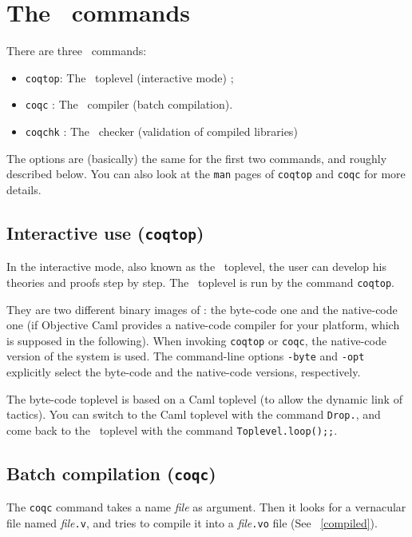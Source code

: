 \chapter[The \Coq~commands]{The \Coq~commands\label{Addoc-coqc}
}

There are three \Coq~commands: 
\begin{itemize}
\item {\tt coqtop}: The \Coq\ toplevel (interactive mode) ; 
\item {\tt coqc} : The \Coq\ compiler (batch compilation).
\item {\tt coqchk} : The \Coq\ checker (validation of compiled libraries)
\end{itemize}
The options are (basically) the same for the first two commands, and
roughly described below. You can also look at the \verb!man! pages of
\verb!coqtop! and \verb!coqc! for more details.


\section{Interactive use ({\tt coqtop})}

In the interactive mode, also known as the \Coq~toplevel, the user can
develop his theories and proofs step by step.  The \Coq~toplevel is
run by the command {\tt coqtop}. 

\label{binary-images}
They are two different binary images of \Coq: the byte-code one and
the native-code one (if Objective Caml provides a native-code compiler
for your platform, which is supposed in the following).  When invoking
\verb!coqtop! or \verb!coqc!, the native-code version of the system is
used.  The command-line options \verb!-byte! and \verb!-opt! explicitly
select the byte-code and the native-code versions, respectively.

The byte-code toplevel is based on a Caml
toplevel (to allow the dynamic link of tactics).  You can switch to
the Caml toplevel with the command \verb!Drop.!, and come back to the
\Coq~toplevel with the command \verb!Toplevel.loop();;!.


\section{Batch compilation ({\tt coqc})}
The {\tt coqc} command takes a name {\em file} as argument.  Then it
looks for a vernacular file named {\em file}{\tt .v}, and tries to
compile it into a {\em file}{\tt .vo} file (See ~\ref{compiled}).

